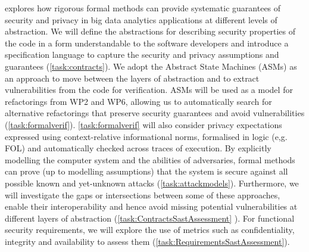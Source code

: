 \begin{Workpackage}{\thewpno}

\begin{WPDescription}
\theWP{} explores how rigorous formal methods can provide systematic guarantees of security and privacy in big data analytics applications at different levels of abstraction.
We will define the abstractions for describing security properties of the code in a form understandable to the software developers and introduce a specification language to capture the security and privacy assumptions and guarantees (\ref{task:contracts}). We adopt the Abstract State Machines (ASMs) as an approach to move between the layers of abstraction and to extract vulnerabilities from the code for verification. ASMs will be used as a model for refactorings from WP2 and WP6, allowing us to automatically search for alternative refactorings that preserve security guarantees and avoid vulnerabilities (\ref{task:formalverif}). \ref{task:formalverif} will also consider privacy expectations expressed using context-relative informational norms, formalised in logic (e,g. FOL) and automatically checked across traces of execution. By explicitly modelling the computer system and the abilities of adversaries, formal methods can prove (up to modelling assumptions) that the system is secure against all possible known and yet-unknown attacks (\ref{task:attackmodels}). Furthermore, we will investigate the gaps or intersections between some of these approaches, enable their interoperability and hence avoid missing potential vulnerabilities at different layers of abstraction (\ref{task:ContractsSastAssessment} ). For functional security requirements, we will explore the use of metrics such as confidentiality, integrity and availability to assess them (\ref{task:RequirementsSastAssessment}).
\end{WPDescription}


\end{Workpackage}
